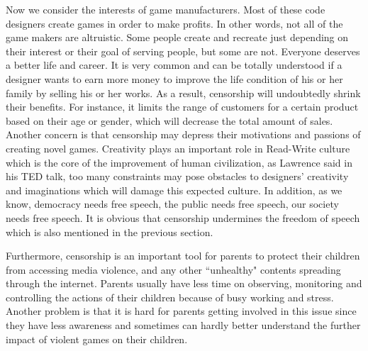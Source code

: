 Now we consider the interests of game manufacturers. Most of these code designers create games in order to make profits. In other words, not all of the game makers are altruistic. Some people create and recreate just depending on their interest or their goal of serving people, but some are not. Everyone deserves a better life and career. It is very common and can be totally understood if a designer wants to earn more money to improve the life condition of his or her family by selling his or her works. As a result, censorship will undoubtedly shrink their benefits. For instance, it limits the range of customers for a certain product based on their age or gender, which will decrease the total amount of sales. Another concern is that censorship may depress their motivations and passions of creating novel games. Creativity plays an important role in Read-Write culture which is the core of the improvement of human civilization, as Lawrence said in his TED talk, too many constraints may pose obstacles to designers' creativity and imaginations which will damage this expected culture. In addition, as we know, democracy needs free speech, the public needs free speech, our society needs free speech. It is obvious that censorship undermines the freedom of speech which is also mentioned in the previous section.  

Furthermore, censorship is an important tool for parents to protect their children from accessing media violence, and any other ``unhealthy" contents spreading through the internet. Parents usually have less time on observing, monitoring and controlling the actions of their children because of busy working and stress. Another problem is that it is hard for parents getting involved in this issue since they have less awareness and sometimes can hardly better understand the further impact of violent games on their children.

